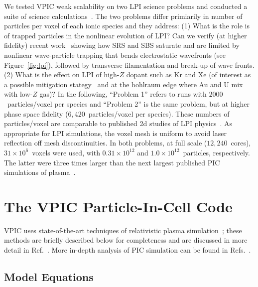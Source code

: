 \documentclass[journal,twoside]{IEEEtran}
\newcommand{\fig}[1]{Figure~\ref{fig:#1}}
\begin{document}
We tested VPIC weak scalability on two LPI science problems and
conducted a suite of science calculations~\cite{AAC_Conference_Paper}.
The two problems differ primiarily in number of particles per voxel of
each ionic species and they address: (1) What is the role is of
trapped particles in the nonlinear evolution of LPI?  Can we verify
(at higher fidelity) recent
work~\cite{Yin_et_al_PRL_2007_SRS,Yin_et_al_Phys_Plasmas_2007_SRS}
showing how SRS and SBS saturate and are limited by nonlinear
wave-particle trapping that bends electrostatic wavefronts (see
\fig{lpi}), followed by transverse filamentation and break-up
of wave fronts.  (2) What is the effect on LPI of high-$Z$ dopant such
as Kr and Xe (of interest as a possible mitigation
stategy~\cite{Lushnikov_PPCF_2006} and at the hohlraum edge where Au
and U mix with low-$Z$ gas)?  In the following, ``Problem 1'' refers
to runs with $2000$~particles/voxel per species and ``Problem 2'' is
the same problem, but at higher phase space fidelity
($6,420$~particles/voxel per species).  These numbers of
particles/voxel are comparable to published 2d studies of LPI
physics~\cite{Yin_et_al_PRL_2007_SRS,Yin_et_al_Phys_Plasmas_2007_SRS}.
As appropriate for LPI simulations, the voxel mesh is uniform to avoid
laser reflection off mesh discontinuities.  In both problems, at full
scale ($12,240$~cores), $31 \times 10^6$~voxels were used, with $0.31
\times 10^{12}$ and $1.0 \times 10^{12}$~particles, respectively.  The
latter were three times larger than the next largest published PIC
simulations of plasma~\cite{Yin_et_al_PRL_2007_reconnection}.


\section{The VPIC Particle-In-Cell Code}

VPIC uses state-of-the-art techniques of relativistic plasma
simulation~\cite{Blahovec_et_al_2000,Eastwood_et_al_1995,
Jones_et_al_1996,Kwan_Snell_1985,Nieter_Cary_2004,
Verboncoeur_et_al_1995}; these methods are briefly described below for
completeness and are discussed in more detail in
Ref.~\cite{Bowers_et_al_Phys_Plasmas_2007}.  More in-depth analysis of
PIC simulation can be found in
Refs.~\cite{Birdsall_Langdon_1985,Hockney_Eastwood_1988}.

\subsection{Model Equations}
\end{document}
